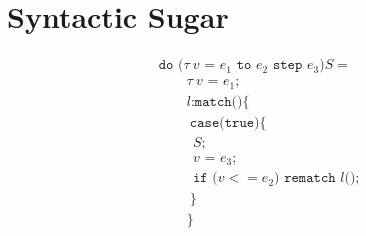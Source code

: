 \documentclass[a4j]{article}
\newcommand{\update}{\textit{update}}
\newcommand{\tuple}[1]{\langle #1 \rangle}
\newcommand{\rematch}{
  \texttt{rematch } l \texttt{ (}\vec{a}\texttt{)}
}
\newcommand{\dostmt}{
  \texttt{do (}\tau\ v \texttt{ = } e_1 \texttt{ to } e_2 \texttt{ step } e_3\texttt{)} S
}
\begin{document}

\section{Syntactic Sugar}
\[
\begin{array}{l}
\dostmt =\\
\qquad \tau\ v \texttt{ = } e_1\texttt{;}\\
\qquad l\texttt{:match()}\{\\
\qquad\ \texttt{case(true)\{ }\\
\qquad\ \ S\texttt{; }\\
\qquad\ \ v \texttt{ = } e_3 \texttt{;}\\
\qquad\ \ \texttt{if (}v <= e_2\texttt{) rematch }l\texttt{();}\\
\qquad\ \texttt{\}}\\
\qquad \texttt{\}}
\end{array}
\]
\end{document}
